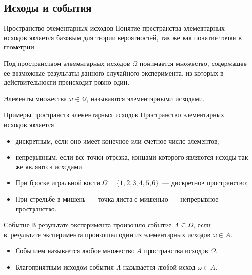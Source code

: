 \documentclass[unicode,11pt,notheorems,xcolor=table]{beamer}
\begin{document}
\subsection{Исходы и события}

\begin{frame}{Пространство элементарных исходов}{}
    Понятие пространства элементарных исходов является базовым для теории вероятностей,
    так же как понятие точки в геометрии.
    
    \begin{block}{}
        Под \alert{пространством элементарных исходов $\Omega$} понимается множество, содержащее ее возможные результаты данного случайного эксперимента, из которых в действительности происходит ровно один. 
    \end{block}

    Элементы множества $\omega \in \Omega$, называются \alert{элементарными исходами}.
    
\end{frame}    
\begin{frame}{Примеры пространств элементарных исходов}{}
    Пространство элементарных исходов является 
    \begin{itemize}
        \item \alert{дискретным}, если оно имеет конечное или счетное число элементов;
        \item \alert{непрерывным}, если все точки отрезка, концами которого являются исходы так же являются исходами.
    \end{itemize}

    \medskip
    \begin{itemize}
        \item При броске игральной кости $\Omega=\{1,2,3,4,5,6\}$~--- дискретное пространство;
        \item При стрельбе в мишень~--- точка листа с мишенью~--- непрерывное пространство.
    \end{itemize}
\end{frame}
\begin{frame}{Событие}
    В результате эксперимента \alert{произошло событие $A \subseteq \Omega$}, если в~результате эксперимента произошел один из элементарных исходов $\omega \in A$. 
    
    \begin{block}{}
        \begin{itemize}
            \item \alert{Событием} называется любое множество $A$ пространства исходов $\Omega$.
            \item \alert{Благоприятным исходом события $A$} называется любой исход $\omega \in A$.
        \end{itemize}
    \end{block}
\end{frame}
\end{document}
